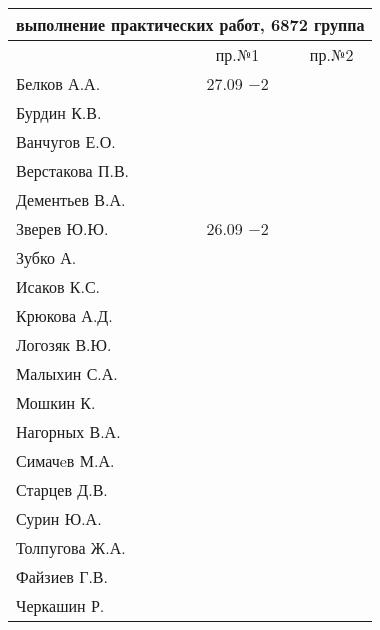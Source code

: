 \documentclass[a4paper,11pt]{article}
\begin{document}
\newpage
\begin{tabular}{l|cc}
\multicolumn{3}{c}{выполнение практических работ, 6872 группа} \\
\toprule
& пр.№1 & пр.№2 \\
\midrule
Белков А.А.    &27.09 $-2$&     \\   
Бурдин К.В.    &     &     \\
Ванчугов Е.О.  &     &     \\
Верстакова П.В.&     &     \\
Дементьев В.А. &     &     \\
Зверев Ю.Ю.    &26.09 $-2$&     \\
Зубко А.       &     &     \\
Исаков К.С.    &     &     \\
Крюкова А.Д.   &     &     \\
Логозяк В.Ю.   &     &     \\
Малыхин С.А.   &     &     \\
Мошкин К.      &     &     \\
Нагорных В.А.  &     &     \\
Симачeв М.А.   &     &     \\
Старцев Д.В.   &     &     \\
Сурин Ю.А.     &     &     \\
Толпугова Ж.А. &     &     \\
Файзиев Г.В.   &     &     \\
Черкашин Р.    &     &     \\
\bottomrule
\end{tabular}
\end{document}
